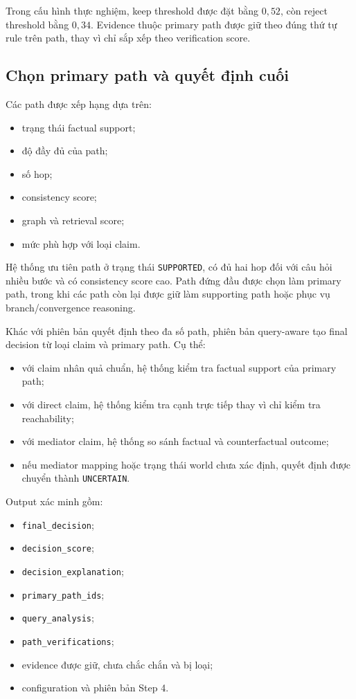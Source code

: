 Trong cấu hình thực nghiệm, keep threshold được đặt bằng \(0{,}52\), còn
reject threshold bằng \(0{,}34\). Evidence thuộc primary path được giữ theo
đúng thứ tự rule trên path, thay vì chỉ sắp xếp theo verification score.

\subsection{Chọn primary path và quyết định cuối}

Các path được xếp hạng dựa trên:

\begin{itemize}
    \item trạng thái factual support;
    \item độ đầy đủ của path;
    \item số hop;
    \item consistency score;
    \item graph và retrieval score;
    \item mức phù hợp với loại claim.
\end{itemize}

Hệ thống ưu tiên path ở trạng thái \texttt{SUPPORTED}, có đủ hai hop đối với
câu hỏi nhiều bước và có consistency score cao. Path đứng đầu được chọn làm
primary path, trong khi các path còn lại được giữ làm supporting path hoặc
phục vụ branch/convergence reasoning.

Khác với phiên bản quyết định theo đa số path, phiên bản query-aware tạo
final decision từ loại claim và primary path. Cụ thể:

\begin{itemize}
    \item với claim nhân quả chuẩn, hệ thống kiểm tra factual support của
    primary path;

    \item với direct claim, hệ thống kiểm tra cạnh trực tiếp thay vì chỉ
    kiểm tra reachability;

    \item với mediator claim, hệ thống so sánh factual và counterfactual
    outcome;

    \item nếu mediator mapping hoặc trạng thái world chưa xác định, quyết
    định được chuyển thành \texttt{UNCERTAIN}.
\end{itemize}

Output xác minh gồm:

\begin{itemize}
    \item \texttt{final\_decision};
    \item \texttt{decision\_score};
    \item \texttt{decision\_explanation};
    \item \texttt{primary\_path\_ids};
    \item \texttt{query\_analysis};
    \item \texttt{path\_verifications};
    \item evidence được giữ, chưa chắc chắn và bị loại;
    \item configuration và phiên bản Step 4.
\end{itemize}

